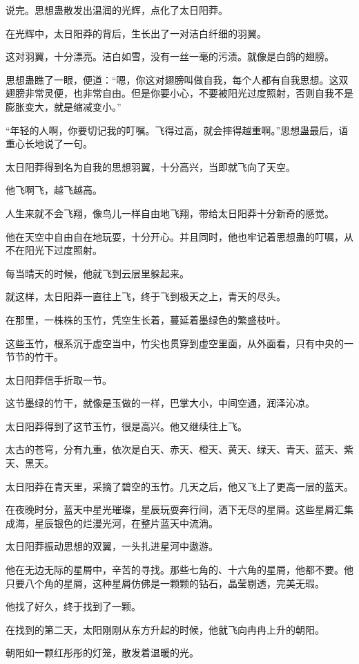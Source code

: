 \begin{this_body}
说完。思想蛊散发出温润的光辉，点化了太日阳莽。

在光辉中，太日阳莽的背后，生长出了一对洁白纤细的羽翼。

这对羽翼，十分漂亮。洁白如雪，没有一丝一毫的污渍。就像是白鸽的翅膀。

思想蛊瞧了一眼，便道：“嗯，你这对翅膀叫做自我，每个人都有自我思想。这双翅膀非常灵便，也非常自由。但是你要小心，不要被阳光过度照射，否则自我不是膨胀变大，就是缩减变小。”

“年轻的人啊，你要切记我的叮嘱。飞得过高，就会摔得越重啊。”思想蛊最后，语重心长地说了一句。

太日阳莽得到名为自我的思想羽翼，十分高兴，当即就飞向了天空。

他飞啊飞，越飞越高。

人生来就不会飞翔，像鸟儿一样自由地飞翔，带给太日阳莽十分新奇的感觉。

他在天空中自由自在地玩耍，十分开心。并且同时，他也牢记着思想蛊的叮嘱，从不在阳光下过度照射。

每当晴天的时候，他就飞到云层里躲起来。

就这样，太日阳莽一直往上飞，终于飞到极天之上，青天的尽头。

在那里，一株株的玉竹，凭空生长着，蔓延着墨绿色的繁盛枝叶。

这些玉竹，根系沉于虚空当中，竹尖也贯穿到虚空里面，从外面看，只有中央的一节节的竹干。

太日阳莽信手折取一节。

这节墨绿的竹干，就像是玉做的一样，巴掌大小，中间空通，润泽沁凉。

太日阳莽得到了这节玉竹，很是高兴。他又继续往上飞。

太古的苍穹，分有九重，依次是白天、赤天、橙天、黄天、绿天、青天、蓝天、紫天、黑天。

太日阳莽在青天里，采摘了碧空的玉竹。几天之后，他又飞上了更高一层的蓝天。

在夜晚时分，蓝天中星光璀璨，星辰玩耍奔行间，洒下无尽的星屑。这些星屑汇集成海，星辰银色的烂漫光河，在整片蓝天中流淌。

太日阳莽振动思想的双翼，一头扎进星河中遨游。

他在无边无际的星屑中，辛苦的寻找。那些七角的、十六角的星屑，他都不要。他只要八个角的星屑，这种星屑仿佛是一颗颗的钻石，晶莹剔透，完美无瑕。

他找了好久，终于找到了一颗。

在找到的第二天，太阳刚刚从东方升起的时候，他就飞向冉冉上升的朝阳。

朝阳如一颗红彤彤的灯笼，散发着温暖的光。


\end{this_body}
